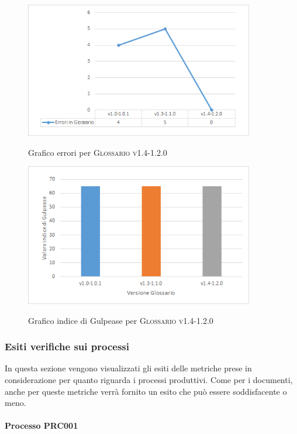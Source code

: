 \documentclass[../piano-di-qualifica.tex]{subfiles}
\begin{document}
\begin{figure}[H]
  \centering
  \includegraphics[width=10cm]{img/erroriGlosv1.4-1.2.0.png}
  \label{fig:errori_glos}
  \caption{Grafico errori per \textsc{Glossario v1.4-1.2.0}}
\end{figure}

\begin{figure}[H]
  \centering
  \includegraphics[width=10cm]{img/gulpeaseGlosv1.4-1.2.0.png}
  \label{fig:gulpease_glos}
  \caption{Grafico indice di Gulpease per \textsc{Glossario v1.4-1.2.0}}
\end{figure}

\subsubsection{Esiti verifiche sui processi}
\label{sub:esiti_verifiche_sui_processi}
In questa sezione vengono visualizzati gli esiti delle metriche prese in considerazione per quanto riguarda i processi produttivi.
Come per i documenti, anche per queste metriche verrà fornito un esito che può essere soddisfacente o meno.

\paragraph{Processo PRC001}
\label{sub:processo_PRC001}
\end{document}
